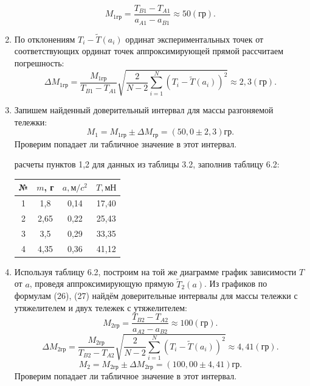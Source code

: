 \documentclass[12pt]{article}
\begin{document}
\begin{enumerate}
\begin{equation}
M_{1гр} =\frac{T_{B1} - T_{A1}}{a_{A1} - a_{B1}}\approx50(гр).
\end{equation}
\item По отклонениям $T_{i} - \widetilde{T}(a_{i})$ ординат
экспериментальных точек от
соответствующих ординат точек
аппроксимирующей прямой рассчитаем
погрешность:
\begin{equation}
\Delta M_{1гр} =\frac{M_{1гр}}{T_{B1} - T_{A1}}\sqrt{\frac{2}{N-2}\sum_{i=1}^N(T_{i} - \widetilde{T}(a_{i}))^2}\approx2,3(гр).
\end{equation}
\item Запишем найденный доверительный интервал для массы
разгоняемой тележки:
\begin{equation}
M_{1} =M_{1гр}\pm\Delta M_{гр}=(50,0\pm2,3)гр.
\end{equation}Проверим попадает ли табличное значение в этот
интервал.

 расчеты пунктов 1,2 для данных из таблицы 3.2, заполнив
таблицу 6.2:
\begin{table}[h!]
\begin{center}
\begin{tabular}{|c|c|c|c|}
\hline
 № & $m$, г & $a, м/c^2$   & $T, мН$ \\
\hline
 1 &1,8	&0,14&	17,40\\
\hline
 2 &2,65&	0,22&	25,43\\
\hline
 3 &  3,5	&0,29&	33,35 \\
\hline
 4 &4,35	&0,36	&41,12	\\
\hline
\end{tabular}
\end{center}
\end{table}
\item Используя таблицу 6.2, построим на той же диаграмме
график зависимости $T$ от $a$, проведя аппроксимирующую прямую $\widetilde{T}_{2}(a)$. Из графиков по формулам (26), (27) найдём
доверительные интервалы для массы тележки с утяжелителем и двух тележек с
утяжелителем:
\begin{equation}
M_{2гр} =\frac{T_{B2} - T_{A2}}{a_{A2} - a_{B2}}\approx100(гр).
\end{equation}
\begin{equation}
\Delta M_{2гр} =\frac{M_{2гр}}{T_{B2} - T_{A2}}\sqrt{\frac{2}{N-2}\sum_{i=1}^N(T_{i} - \widetilde{T}(a_{i}))^2}\approx4,41(гр).
\end{equation}
\begin{equation}
M_{2} =M_{2гр}\pm\Delta M_{2гр}=(100,00\pm4,41)гр.
\end{equation}
Проверим попадает ли табличное значение в этот
интервал.
\end{enumerate}
\end{document}
